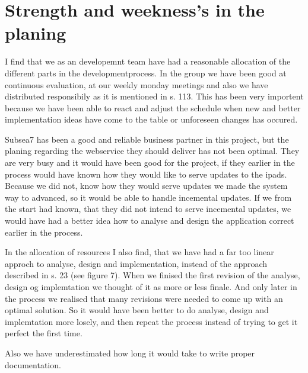 \section{Strength and weekness's in the planing}
    I find that we as an developemnt team have had a reasonable allocation of
    the different parts in the developmentprocess. In the group we have been
    good at continuous evaluation, at our weekly monday meetings and also we
    have distributed responsibily as it is mentioned in \cite{oose} s. 113.
    This has been very importent because we have been able to react and adjust
    the schedule when new and better implementation ideas have come to the
    table or unforeseen changes has occured.

    Subsea7 has been a good and reliable business partner in this project, but
    the planing regarding the webservice they should deliver has not been
    optimal. They are very busy and it would have been good for the project, if
    they earlier in the process would have known how they would like to  serve
    updates to the ipads. Because we did not, know how they would serve updates
    we made the system way to advanced, so it would be able to handle
    incemental updates. If we from the start had known, that they did not
    intend to serve incemental updates, we would have had a better idea how to
    analyse and design the application correct earlier in the process.

    In the allocation of resources I also find, that we have had a far too
    linear approch to analyse, design and implementation, instead of the
    approach described in \cite{mad-article} s. 23 (see figure 7). When we
    finised the first revision of the analyse, design og implemtation we
    thought of it as more or less finale. And only later in the process we
    realised that many revisions were needed to come up with an optimal
    solution. So it would have been better to do analyse, design and
    implemtation more losely, and then repeat the process instead of trying to
    get it perfect the first time.

    Also we have underestimated how long it would take to write proper
    documentation.
